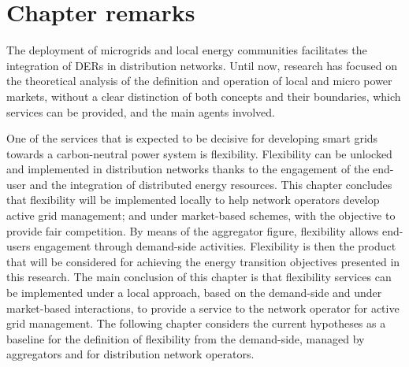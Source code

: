 \newpage
\section{Chapter remarks} \label{sec:conclusions}

The deployment of microgrids and local energy communities facilitates the integration of DERs in distribution networks. Until now, research has focused on the theoretical analysis of the definition and operation of local and micro power markets, without a clear distinction of both concepts and their boundaries, which services can be provided, and the main agents involved.  

One of the services that is expected to be decisive for developing smart grids towards a carbon-neutral power system is flexibility. Flexibility can be unlocked and implemented in distribution networks thanks to the engagement of the end-user and the integration of distributed energy resources. This chapter concludes that flexibility will be implemented locally to help network operators develop active grid management; and under market-based schemes, with the objective to provide fair competition. By means of the aggregator figure, flexibility allows end-users engagement through demand-side activities. Flexibility is then the product that will be considered for achieving the energy transition objectives presented in this research. The main conclusion of this chapter is that flexibility services can be implemented under a local approach, based on the demand-side and under market-based interactions, to provide a service to the network operator for active grid management. The following chapter considers the current hypotheses as a baseline for the definition of flexibility from the demand-side, managed by aggregators and for distribution network operators.
	


